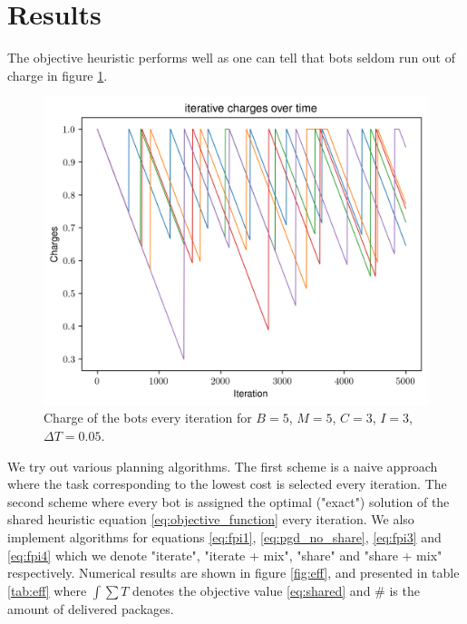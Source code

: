 \documentclass{article}
\newcommand{\sectiontype}{}
\begin{document}
\section*{Results}
\renewcommand{\sectiontype}{Results}
The objective heuristic performs well as one can tell that bots seldom run out of charge in figure \ref{fig:charges}.
\begin{figure}[h]
    \centering
  \includegraphics[width=0.35\linewidth]{tex/charges.png}
    \caption{Charge of the bots every iteration for $B = 5$, $M = 5$, $C = 3$, $I=3$, $\Delta T = 0.05$. }
  \label{fig:charges}
\end{figure}

 We try out various planning algorithms. The first scheme is a naive approach where the task corresponding to the lowest cost is selected every iteration. The second scheme where every bot is assigned the optimal ("exact") solution of the shared heuristic equation \eqref{eq:objective_function} every iteration. We also implement algorithms for equations \eqref{eq:fpi1}, \eqref{eq:pgd_no_share}, \eqref{eq:fpi3} and \eqref{eq:fpi4} which we denote "iterate", "iterate + mix", "share" and "share + mix" respectively. Numerical results are shown in figure \ref{fig:eff}, and presented in table \ref{tab:eff} where $\int\sum T$ denotes the objective value \eqref{eq:shared} and \# is the amount of delivered packages.
\end{document}
